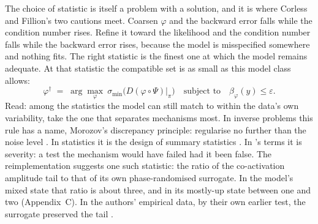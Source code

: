 \documentclass[11pt]{article}
\theoremstyle{definition}\newtheorem{observation}{Observation}
\theoremstyle{remark}\newtheorem{remark}{Remark}
\begin{document}
The choice of statistic is itself a problem with a solution, and it is where Corless and Fillion's two cautions meet. Coarsen $\varphi$ and the backward error falls while the condition number rises. Refine it toward the likelihood and the condition number falls while the backward error rises, because the model is misspecified somewhere and nothing fits. The right statistic is the finest one at which the model remains adequate. At that statistic the compatible set is as small as this model class allows:
\begin{equation}
\varphi^{\dagger}\;=\;\arg\max_{\varphi}\ \sigma_{\min}\!\bigl(D(\varphi\circ\Psi)\big|_{\pi}\bigr)
\quad\text{subject to}\quad \beta_{\varphi}(y)\le\varepsilon .
\label{eq:design}
\end{equation}
Read: among the statistics the model can still match to within the data's own variability, take the one that separates mechanisms most. In inverse problems this rule has a name, Morozov's discrepancy principle: regularise no further than the noise level \parencite{engl1996}. In statistics it is the design of summary statistics \parencite{fearnhead2012}. In \textcite{mayo1996}'s terms it is severity: a test the mechanism would have failed had it been false. The reimplementation suggests one such statistic: the ratio of the co-activation amplitude tail to that of its own phase-randomised surrogate. In the model's mixed state that ratio is about three, and in its mostly-up state between one and two (Appendix~C). In the authors' empirical data, by their own earlier test, the surrogate preserved the tail \parencite[Extended Data Fig.~9-1]{rabuffo2021}.
\end{document}
